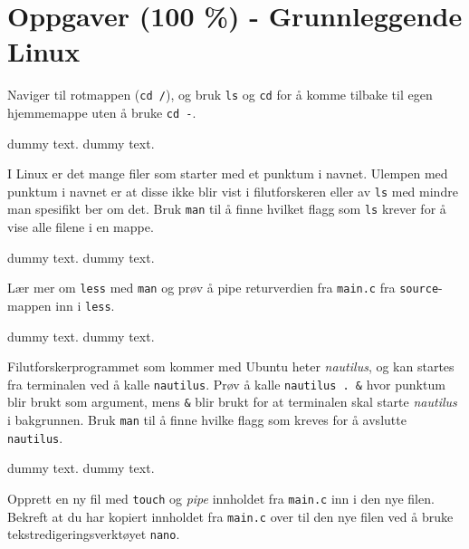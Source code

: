 \section{Oppgaver (100 \%) - Grunnleggende Linux}\label{sec:3-oppgave}


\begin{subprob}
    Naviger til rotmappen (\verb|cd /|), og bruk \verb|ls| og \verb|cd| for å komme tilbake til egen hjemmemappe uten å bruke \verb|cd -|.
	\begin{solution}
	    dummy text. dummy text. 
	\end{solution}
\end{subprob}

\begin{subprob}
    I Linux er det mange filer som starter med et punktum i navnet. Ulempen med punktum i navnet er at disse ikke blir vist i filutforskeren eller av \verb|ls| med mindre man spesifikt ber om det. Bruk \verb|man| til å finne hvilket flagg som \verb|ls| krever for å vise alle filene i en mappe. 
	\begin{solution}
	    dummy text. dummy text. 
	\end{solution}
\end{subprob}

\begin{subprob} %
    Lær mer om \verb|less| med \verb|man| og prøv å pipe returverdien fra \verb|main.c| fra \verb|source|-mappen inn i \verb|less|.
    
	\begin{solution}
	    dummy text. dummy text. 
	\end{solution}
\end{subprob}

\begin{subprob}
    Filutforskerprogrammet som kommer med Ubuntu heter \textit{nautilus}, og kan startes fra terminalen ved å kalle \verb|nautilus|. Prøv å kalle \verb|nautilus . &| hvor punktum blir brukt som argument, mens \verb|&| blir brukt for at terminalen skal starte \textit{nautilus} i bakgrunnen. Bruk \verb|man| til å finne hvilke flagg som kreves for å avslutte \verb|nautilus|.
    \begin{solution}
        dummy text. dummy text. 
	\end{solution}
\end{subprob}

\begin{subprob}
    Opprett en ny fil med \verb|touch| og \textit{pipe} innholdet fra \verb|main.c| inn i den nye filen. Bekreft at du har kopiert innholdet fra \verb|main.c| over til den nye filen ved å bruke tekstredigeringsverktøyet \verb|nano|.
\end{subprob}

